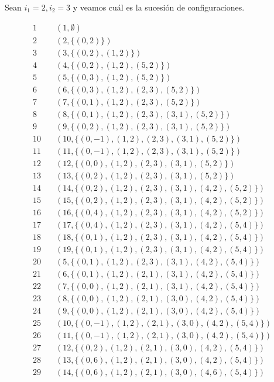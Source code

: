 \documentclass[twoside]{article}
\begin{document}
\begin{ej}
Sean $i_1=2,i_2=3$ y veamos cuál es la sucesión de configuraciones.

\begin{align*}
1\quad &(1, \emptyset)\\
2\quad &(2,\{(0,2)\})\\
3\quad&(3, \{(0,2),(1,2)\})\\
4\quad&(4,\{(0,2),(1,2),(5,2)\})\\
5\quad&(5,\{(0,3),(1,2),(5,2)\})\\
6\quad&(6,\{(0,3),(1,2),(2,3),(5,2)\})\\
7\quad&(7,\{(0,1),(1,2),(2,3),(5,2)\})\\
8\quad&(8,\{(0,1),(1,2),(2,3),(3,1),(5,2)\})\\
9\quad&(9,\{(0,2),(1,2),(2,3),(3,1),(5,2)\})\\
10\quad&(10,\{(0,-1),(1,2),(2,3),(3,1),(5,2)\})\\
11\quad&(11,\{(0,-1),(1,2),(2,3),(3,1),(5,2)\})\\
12\quad&(12,\{(0,0),(1,2),(2,3),(3,1),(5,2)\})\\
13\quad&(13,\{(0,2),(1,2),(2,3),(3,1),(5,2)\})\\
14\quad&(14,\{(0,2),(1,2),(2,3),(3,1),(4,2),(5,2)\})\\
15\quad&(15,\{(0,2),(1,2),(2,3),(3,1),(4,2),(5,2)\})\\
16\quad&(16,\{(0,4),(1,2),(2,3),(3,1),(4,2),(5,2)\})\\
17\quad&(17,\{(0,4),(1,2),(2,3),(3,1),(4,2),(5,4)\})\\
18\quad&(18,\{(0,1),(1,2),(2,3),(3,1),(4,2),(5,4)\})\\
19\quad&(19,\{(0,1),(1,2),(2,3),(3,1),(4,2),(5,4)\})\\
20\quad&(5,\{(0,1),(1,2),(2,3),(3,1),(4,2),(5,4)\})\\
21\quad&(6,\{(0,1),(1,2),(2,1),(3,1),(4,2),(5,4)\})\\
22\quad&(7,\{(0,0),(1,2),(2,1),(3,1),(4,2),(5,4)\})\\
23\quad&(8,\{(0,0),(1,2),(2,1),(3,0),(4,2),(5,4)\})\\
24\quad&(9,\{(0,0),(1,2),(2,1),(3,0),(4,2),(5,4)\})\\
25\quad&(10,\{(0,-1),(1,2),(2,1),(3,0),(4,2),(5,4)\})\\
26\quad&(11,\{(0,-1),(1,2),(2,1),(3,0),(4,2),(5,4)\})\\
27\quad&(12,\{(0,2),(1,2),(2,1),(3,0),(4,2),(5,4)\})\\
28\quad&(13,\{(0,6),(1,2),(2,1),(3,0),(4,2),(5,4)\})\\
29\quad&(14,\{(0,6),(1,2),(2,1),(3,0),(4,6),(5,4)\})\\
\end{align*}


\end{ej}
\end{document}
